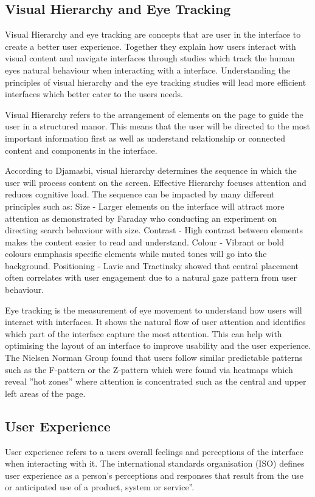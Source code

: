 \documentclass[]{project_final}
\begin{document}
\subsection{Visual Hierarchy and Eye Tracking}

Visual Hierarchy and eye tracking are concepts that are user in the interface to create a better user experience. Together they explain how users interact with visual content and navigate interfaces through studies which track the human eyes natural behaviour when interacting with a interface. Understanding the principles of visual hierarchy and the eye tracking studies will lead more efficient interfaces which better cater to the users needs.

Visual Hierarchy refers to the arrangement of elements on the page to guide the user in a structured manor. This means that the user will be directed to the most important information first as well as understand relationship or connected content and components in the interface.\cite{visual_heirarchy}

According to Djamasbi, visual hierarchy determines the sequence in which the user will
process content on the screen. Effective Hierarchy focuses attention and reduces cognitive
load. The sequence can be impacted by many different principles such as:
Size - Larger elements on the interface will attract more attention as demonstrated by
Faraday who conducting an experiment on directing search behaviour with size.
Contrast - High contrast between elements makes the content easier to read and understand.
Colour - Vibrant or bold colours enmphasis specific elements while muted tones will go into
the background.\cite{djamasbi_visual_2011}
Positioning - Lavie and Tractinsky showed that central placement often correlates with user
engagement due to a natural gaze pattern from user behaviour.

Eye tracking is the measurement of eye movement to understand how users will interact
with interfaces. It shows the natural flow of user attention and identifies which part of the
interface capture the most attention. This can help with optimising the layout of an interface
to improve usability and the user experience. The Nielsen Norman Group found that users
follow similar predictable patterns such as the F-pattern or the Z-pattern which were found
via heatmaps which reveal ”hot zones” where attention is concentrated such as the central
and upper left areas of the page.\cite{eye_tracking_nn}

\subsection{User Experience}
User experience refers to a users overall feelings and perceptions of the interface when interacting with it. The international standards organisation (ISO) defines user experience as a person's perceptions and responses that result from the use or anticipated use of a product, system or service”.
\end{document}
